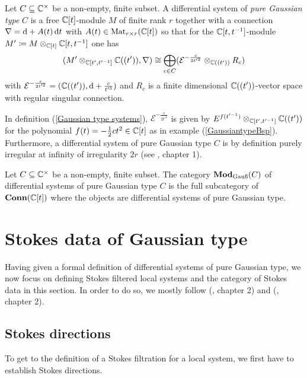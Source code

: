 \begin{defi}\label{Gaussian type systems}
    Let $C \subseteq \C^\times$ be a non-empty, finite subset. A differential system of \emph{pure Gaussian type} $C$ is a free $\C[t]$-module $M$ of finite rank $r$ together with a connection $\nabla = \diff +A(t)\diff{t}$ with $A(t) \in \Mat_{r \times r}(\C[t])$ so that for the $\C[t,t^{-1}]$-module $M' \coloneqq M \otimes_{\C[t]} \C[t,t^{-1}]$ one has 
    \[
    (M' \otimes_{\C[t',t'^{-1}]} \C((t')), \nabla) \cong \bigoplus_{c \in C}(\mathcal{E}^{-\frac{c}{2t'^2}} \otimes_{\C((t'))} R_c) 
    \]
    with $\mathcal{E}^{-\frac{c}{2t'^2}} = (\C((t')), \diff + \frac{c}{t'^3})$ and $R_c$ is a finite dimensional $\C((t'))$-vector space with regular singular connection.
\end{defi}

\begin{rem}
    In definition (\ref{Gaussian type systems}), $\mathcal{E}^{-\frac{c}{2t'^2}}$ is given by $E^{f(t'^{-1})} \otimes_{\C[t',t'^{-1}]} \C((t'))$ for the polynomial $f(t) = -\frac{1}{2}ct^2 \in \C[t]$ as in example (\ref{GaussiantypeBsp}). Furthermore, a differential system of pure Gaussian type $C$ is by definition purely irregular at infinity of irregularity $2r$ (see \cite{Sabbah_2016}, chapter 1).
\end{rem} 

\begin{defi}
    Let $C \subseteq \C^\times$ be a non-empty, finite subset. The category $\Mod(C)$ of differential systems of pure Gaussian type $C$  is the full subcategory of $\Conn(\C[t])$ where the objects are differential systems of pure Gaussian type.
\end{defi}


\section{Stokes data of Gaussian type}
Having given a formal definition of differential systems of pure Gaussian type, we now focus on defining Stokes filtered local systems and the category of Stokes data in this section. In order to do so, we mostly follow (\cite{Sabbah_2016}, chapter 2) and (\cite{Sabbah_StokesStructures}, chapter 2). 

\subsection{Stokes directions}
To get to the definition of a Stokes filtration for a local system, we first have to establish Stokes directions.
\newline

